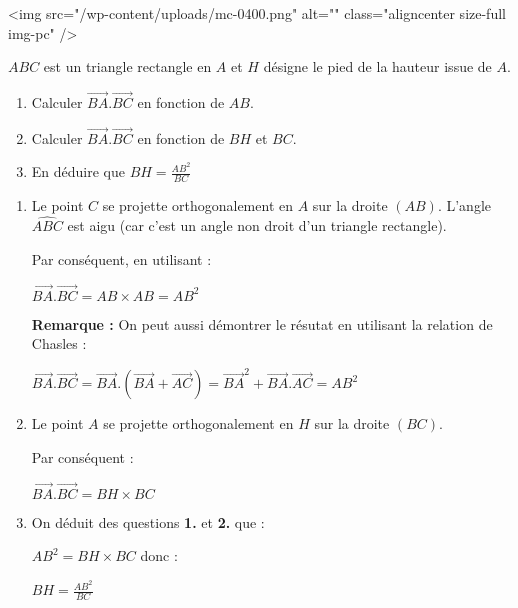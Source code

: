 
%
<img src="/wp-content/uploads/mc-0400.png" alt="" class="aligncenter size-full  img-pc" />

\begin{center}
\end{center}
$ABC$ est un triangle rectangle en $A$ et $H$ désigne le pied de la hauteur issue de $A$.
\begin{enumerate}
     \item
     Calculer $\overrightarrow{BA}.\overrightarrow{BC}$ en fonction de $AB$.
     \item
     Calculer $\overrightarrow{BA}.\overrightarrow{BC}$ en fonction de $BH$ et $BC$.
     \item
     En déduire que $BH=\frac{AB^{2}}{BC}$
\end{enumerate}
\begin{corrige}
     \begin{enumerate}
          \item
          Le point $C$ se projette orthogonalement en $A$ sur la droite $\left(AB\right)$. L'angle $\widehat{ABC}$ est aigu (car c'est un angle non droit d'un triangle rectangle).
          \par
          Par conséquent, en utilisant  :
          \par
          $\overrightarrow{BA}.\overrightarrow{BC}=AB\times AB=AB^{2}$
\par
          \textbf{Remarque :} On peut aussi démontrer le résutat en utilisant la relation de Chasles :
          \par
          $\overrightarrow{BA}.\overrightarrow{BC}=\overrightarrow{BA}.\left(\overrightarrow{BA}+\overrightarrow{AC}\right)=\overrightarrow{BA}^{2}+\overrightarrow{BA}.\overrightarrow{AC}=AB^{2}$
          \item
          Le point $A$ se projette orthogonalement en $H$ sur la droite $\left(BC\right)$.
          \par
          Par conséquent :
          \par
          $\overrightarrow{BA}.\overrightarrow{BC}=BH\times BC$
          \item
          On déduit des questions \textbf{1.} et \textbf{2.} que :
          \par
          $AB^{2}=BH\times BC$ donc :
          \par
          $BH=\frac{AB^{2}}{BC}$
     \end{enumerate}
\end{corrige}
